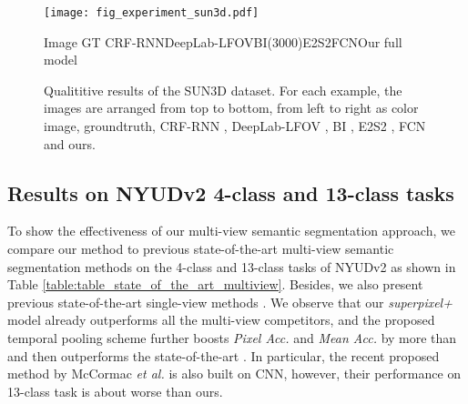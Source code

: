 \begin{figure*}[!t]
\begin{center}
   \texttt{[image: fig\_experiment\_sun3d.pdf]}
   \end{center}
   \scriptsize
   \hspace{2.4cm} Image
   \hspace{1.1cm}GT
   \hspace{0.95cm}CRF-RNN\hspace{0.4cm}DeepLab-LFOV\hspace{0.48cm}BI(3000)\hspace{1.01cm}E2S2\hspace{1.16cm}FCN\hspace{0.77cm}Our full model
   \caption{Qualititive results of the SUN3D dataset.
   For each example, the images are arranged from top to bottom, from left to right as color image, groundtruth, CRF-RNN \cite{crfasrnn_iccv2015}, DeepLab-LFOV \cite{chen2016deeplab}, BI \cite{raghudeep2015spCNN}, E2S2 \cite{region_end2end2016eccv}, FCN \cite{long2015fully} and ours.}
\label{fig:sun3d}
\end{figure*}

\subsection{Results on NYUDv2 4-class and 13-class tasks}
\vspace{-0.1cm}
To show the effectiveness of our multi-view semantic segmentation approach, we compare our method to previous state-of-the-art multi-view semantic segmentation methods \cite{couprie2013indoor,hermans2014dense,stuckler2015dense,SemanticFusion} on the 4-class and 13-class tasks of NYUDv2 as shown in Table \ref{table:table_state_of_the_art_multiview}.
Besides, we also present previous state-of-the-art single-view methods  \cite{david2015multiscale, specificfeature2016eccv,Unsupervised_RGBD_segmentation}.
We observe that our \textit{superpixel+} model already outperforms all the multi-view competitors, and the proposed temporal pooling scheme further boosts \textit{Pixel Acc.} and \textit{Mean Acc.} by more than  and then outperforms the state-of-the-art \cite{david2015multiscale}.
In particular, the recent proposed method by McCormac \emph{et al.} \cite{SemanticFusion} is also built on CNN, however, their performance on 13-class task is about  worse than ours.

